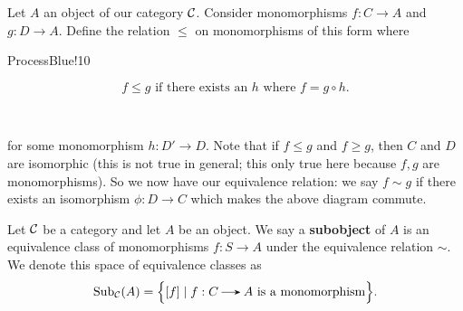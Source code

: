 Let $A$ an object of our category $\mathcal{C}$. Consider monomorphisms $f: C \to A$ and 
$g: D \to A$. Define the relation $\le$ on monomorphisms of this form where 
\begin{statement}{ProcessBlue!10}
\begin{minipage}{0.6\textwidth}
    \[
        f \le g \text{ if there exists an } h \text{ where } f = g \circ h.
    \]
\end{minipage} 
\begin{minipage}{0.4\textwidth}
\end{minipage}
\end{statement}
for some monomorphism $h: D' \to D$. Note that if $f \le g$ and $f \ge g$, 
then $C$ and $D$ are isomorphic (this is not true in general; this only true here 
because $f, g$ are monomorphisms).
So we now have our equivalence relation: we say $f \sim g$ if 
there exists an isomorphism $\phi: D \to C$ which makes the above diagram commute. 

\begin{definition}
    Let $\mathcal{C}$ be a category and let $A$ be an object. We say a \textbf{subobject} 
    of $A$
    is an equivalence class of monomorphisms $f: S \to A$ under the equivalence relation 
    $\sim$. We denote this space of equivalence classes as 
    \[
        \text{Sub}_{\cc}(A) = \Big\{[f] \mid f:C \to A \text{ is a monomorphism} \Big\}.
    \]
\end{definition}

